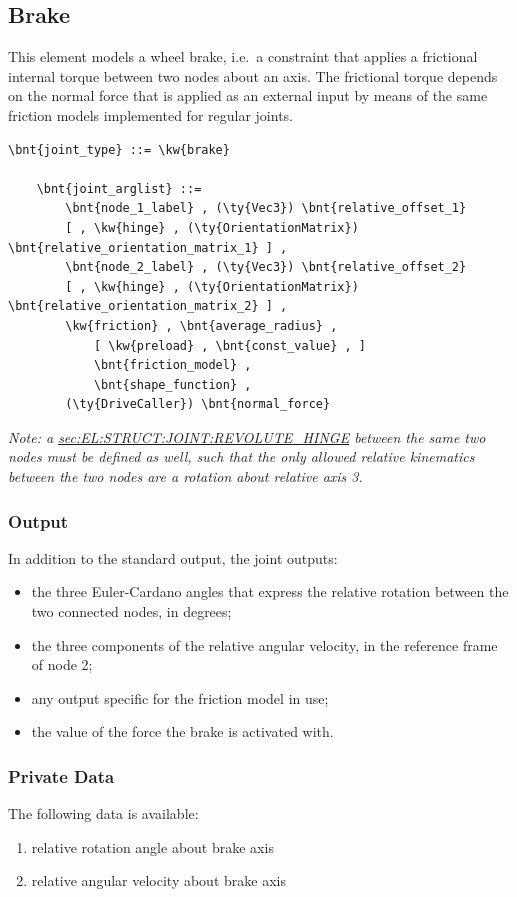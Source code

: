 \subsection{Brake}
This element models a wheel brake, i.e.\ a constraint that applies
a frictional internal torque between two nodes about an axis.
The frictional torque depends on the normal force that is applied 
as an external input by means of the same friction models implemented
for regular joints.
\begin{Verbatim}[commandchars=\\\{\}]
    \bnt{joint_type} ::= \kw{brake}

    \bnt{joint_arglist} ::= 
        \bnt{node_1_label} , (\ty{Vec3}) \bnt{relative_offset_1} 
        [ , \kw{hinge} , (\ty{OrientationMatrix}) \bnt{relative_orientation_matrix_1} ] ,
        \bnt{node_2_label} , (\ty{Vec3}) \bnt{relative_offset_2}
        [ , \kw{hinge} , (\ty{OrientationMatrix}) \bnt{relative_orientation_matrix_2} ] ,
        \kw{friction} , \bnt{average_radius} , 
            [ \kw{preload} , \bnt{const_value} , ]
            \bnt{friction_model} , 
            \bnt{shape_function} ,
        (\ty{DriveCaller}) \bnt{normal_force}
\end{Verbatim}
\emph{Note: a
\hyperref{\kw{revolute hinge}}{\kw{revolute hinge} (see Section~}{)}{sec:EL:STRUCT:JOINT:REVOLUTE_HINGE}
between the same two nodes must be defined as well, such that
the only allowed relative kinematics between the two nodes are
a rotation about relative axis 3.
}

\subsubsection{Output}
In addition to the standard output, the  joint outputs:
\begin{itemize}
\item the three Euler-Cardano angles that express the relative rotation
	between the two connected nodes, in degrees;
\item the three components of the relative angular velocity,
	in the reference frame of node 2;
\item any output specific for the friction model in use;
\item the value of the force the brake is activated with.
\end{itemize}

\subsubsection{Private Data}
The following data is available:
\begin{enumerate}
\item {} relative rotation angle about brake axis
\item {} relative angular velocity about brake axis
\end{enumerate}




